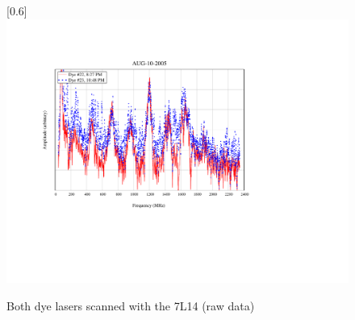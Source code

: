 \begin{figure}
\scalebox{0.8}[0.6]{
\includegraphics[viewport=150 200 300 450, bb=85 160 300 550]
{2X-14/2X-14.pdf}
}
\caption{Both dye lasers scanned with the 7L14 (raw data)}
\label{2X-14}
\end{figure}

